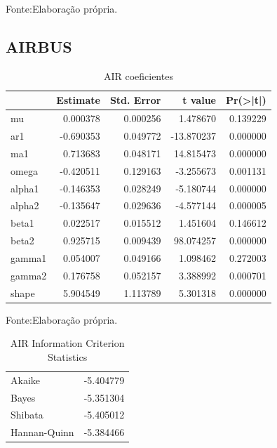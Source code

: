 \documentclass[
  12pt,
  a4paper,
  openany]{book}
\begin{document}
Fonte:Elaboração própria.

\justifying
\bigskip

\hypertarget{airbus}{%
\subsection{AIRBUS}\label{airbus}}

\begin{table}[!h]

\caption{\label{tab:unnamed-chunk-30}AIR coeficientes}
\centering
\begin{tabular}[t]{lrrrr}
\toprule
  &  Estimate &  Std. Error &  t value & Pr(>|t|)\\
\midrule
mu & 0.000378 & 0.000256 & 1.478670 & 0.139229\\
ar1 & -0.690353 & 0.049772 & -13.870237 & 0.000000\\
ma1 & 0.713683 & 0.048171 & 14.815473 & 0.000000\\
omega & -0.420511 & 0.129163 & -3.255673 & 0.001131\\
alpha1 & -0.146353 & 0.028249 & -5.180744 & 0.000000\\
\addlinespace
alpha2 & -0.135647 & 0.029636 & -4.577144 & 0.000005\\
beta1 & 0.022517 & 0.015512 & 1.451604 & 0.146612\\
beta2 & 0.925715 & 0.009439 & 98.074257 & 0.000000\\
gamma1 & 0.054007 & 0.049166 & 1.098462 & 0.272003\\
gamma2 & 0.176758 & 0.052157 & 3.388992 & 0.000701\\
\addlinespace
shape & 5.904549 & 1.113789 & 5.301318 & 0.000000\\
\bottomrule
\end{tabular}
\end{table}
\FloatBarrier
\centering

Fonte:Elaboração própria.

\justifying
\bigskip

\begin{table}[!h]

\caption{\label{tab:unnamed-chunk-31}AIR Information Criterion Statistics}
\centering
\begin{tabular}[t]{lr}
\toprule
  & \\
\midrule
Akaike & -5.404779\\
Bayes & -5.351304\\
Shibata & -5.405012\\
Hannan-Quinn & -5.384466\\
\bottomrule
\end{tabular}
\end{table}
\FloatBarrier
\centering
\end{document}
